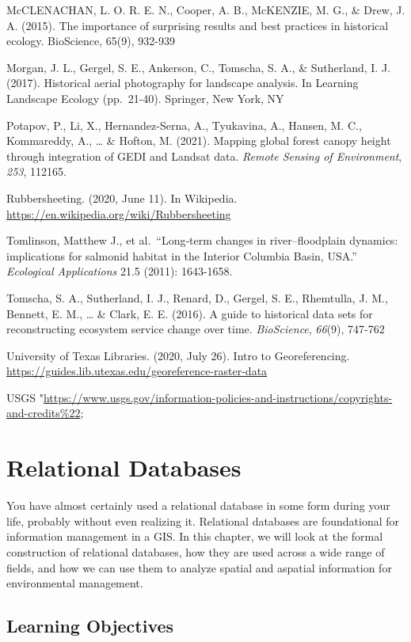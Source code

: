 \documentclass[
]{book}
\begin{document}
McCLENACHAN, L. O. R. E. N., Cooper, A. B., McKENZIE, M. G., \& Drew, J. A. (2015). The importance of surprising results and best practices in historical ecology. BioScience, 65(9), 932-939

Morgan, J. L., Gergel, S. E., Ankerson, C., Tomscha, S. A., \& Sutherland, I. J. (2017). Historical aerial photography for landscape analysis. In Learning Landscape Ecology (pp.~21-40). Springer, New York, NY

Potapov, P., Li, X., Hernandez-Serna, A., Tyukavina, A., Hansen, M. C., Kommareddy, A., \ldots{} \& Hofton, M. (2021). Mapping global forest canopy height through integration of GEDI and Landsat data. \emph{Remote Sensing of Environment}, \emph{253}, 112165.

Rubbersheeting. (2020, June 11). In Wikipedia. \url{https://en.wikipedia.org/wiki/Rubbersheeting}

Tomlinson, Matthew J., et al.~``Long‐term changes in river--floodplain dynamics: implications for salmonid habitat in the Interior Columbia Basin, USA.'' \emph{Ecological Applications} 21.5 (2011): 1643-1658.

Tomscha, S. A., Sutherland, I. J., Renard, D., Gergel, S. E., Rhemtulla, J. M., Bennett, E. M., \ldots{} \& Clark, E. E. (2016). A guide to historical data sets for reconstructing ecosystem service change over time. \emph{BioScience}, \emph{66}(9), 747-762

University of Texas Libraries. (2020, July 26). Intro to Georeferencing. \url{https://guides.lib.utexas.edu/georeference-raster-data}

USGS "\url{https://www.usgs.gov/information-policies-and-instructions/copyrights-and-credits\%22};

\hypertarget{relational-databases}{%
\chapter{Relational Databases}\label{relational-databases}}

You have almost certainly used a relational database in some form during your life, probably without even realizing it. Relational databases are foundational for information management in a GIS. In this chapter, we will look at the formal construction of relational databases, how they are used across a wide range of fields, and how we can use them to analyze spatial and aspatial information for environmental management.

\hypertarget{learning-objectives-4}{%
\section*{Learning Objectives}\label{learning-objectives-4}}
\end{document}
